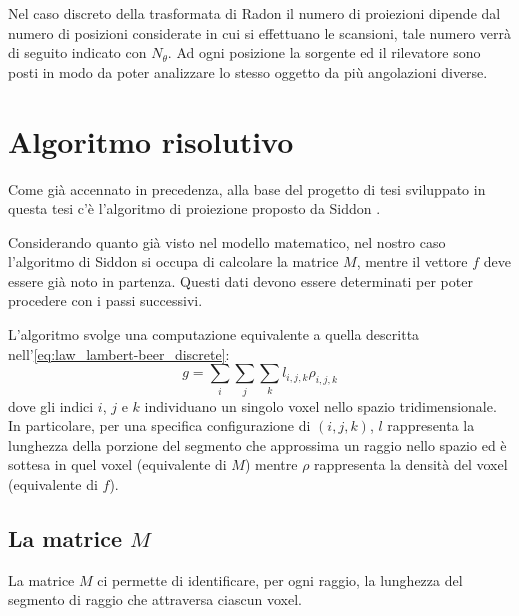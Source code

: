 \documentclass[12pt,a4paper]{report}
\begin{document}
Nel caso discreto della trasformata di Radon il numero di proiezioni dipende dal numero di posizioni considerate in cui si
effettuano le scansioni, tale numero verrà di seguito indicato con \(N_\theta\).
Ad ogni posizione la sorgente ed il rilevatore sono posti in modo da poter analizzare lo stesso oggetto da più angolazioni
diverse.

\section{Algoritmo risolutivo}

Come già accennato in precedenza, alla base del progetto di tesi sviluppato in questa tesi c'è l'algoritmo di proiezione proposto
da Siddon \cite{Siddon1984}.

Considerando quanto già visto nel modello matematico, nel nostro caso l'algoritmo di Siddon si occupa di calcolare la matrice
\(M\), mentre il vettore \(f\) deve essere già noto in partenza.
Questi dati devono essere determinati per poter procedere con i passi successivi.

L'algoritmo svolge una computazione equivalente a quella descritta nell'\autoref{eq:law_lambert-beer_discrete}:
\begin{equation} \label{eq:law_lambert-beer_Siddon}
  g = \sum_i \sum_j \sum_k l_{i, j, k} \rho_{i, j, k}
\end{equation}
dove gli indici \(i\), \(j\) e \(k\) individuano un singolo voxel nello spazio tridimensionale.
In particolare, per una specifica configurazione di \((i, j, k)\), \(l\) rappresenta la lunghezza della porzione del segmento che
approssima un raggio nello spazio ed è sottesa in quel voxel (equivalente di \(M\)) mentre \(\rho\) rappresenta la densità del
voxel (equivalente di \(f\)).

\subsection{La matrice \texorpdfstring{\(M\)}{M}}

La matrice \(M\) ci permette di identificare, per ogni raggio, la lunghezza del segmento di raggio che attraversa ciascun voxel.
\end{document}
